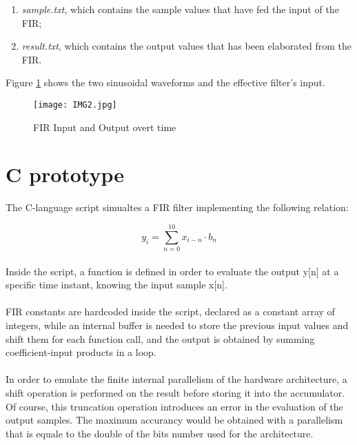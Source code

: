 \begin{enumerate}
	\item \emph{sample.txt}, which contains the sample values that have fed the input of the FIR;
	\item \emph{result.txt}, which contains the output values that has been elaborated from the FIR.
\end{enumerate}

Figure \ref{fig:2} shows the two sinusoidal waveforms and the effective filter's input.
\begin{figure}[!ht]
	\caption{FIR Input and Output overt time}
	\label{fig:2}
	\texttt{[image: IMG2.jpg]}
	\centering
\end{figure}


\section{C prototype}

The C-language script simualtes a FIR filter implementing the following  relation:

\begin{displaymath}[!h]
y_i = \sum_{n=0}^{10}{x_{i-n} \cdot b_n}
\end{displaymath}
\paragraph{}
Inside the script, a function is defined in order to evaluate the output y[n] at a specific time instant, knowing the input sample x[n].
\paragraph{}
FIR constants are hardcoded inside the script, declared as a constant array of integers, while an internal buffer is needed to store the previous input values and shift them for each function call, and the output is obtained by summing coefficient-input products in a loop.
\paragraph{}
In order to emulate the finite internal parallelism of the hardware architecture, a shift operation is performed on the result before storing it into the accumulator.
Of course, this truncation operation introduces an error in the evaluation of the output samples.
The maximum accurancy would be obtained with a parallelism that is equale to the double of the bits number used for the architecture.

